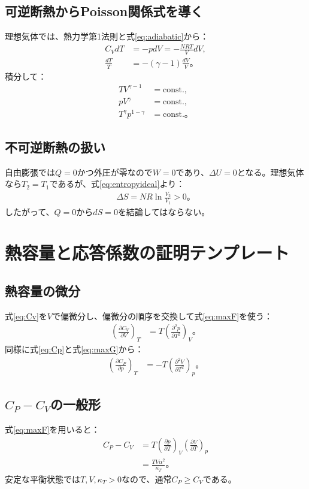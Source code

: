 \documentclass[platex,dvipdfmx,a4paper,10pt]{jsarticle}
\begin{document}
\subsection{可逆断熱からPoisson関係式を導く}
理想気体では、熱力学第1法則と式\eqref{eq:adiabatic}から：
\begin{align*}
  C_VdT&=-pdV=-\frac{NRT}{V}dV,\\
  \frac{dT}{T}&=-(\gamma-1)\frac{dV}{V}。
\end{align*}
積分して：
\begin{align}
  TV^{\gamma-1}&=\mathrm{const.},\label{eq:poissonTV}\\
  pV^\gamma&=\mathrm{const.},\label{eq:poissonPV}\\
  T^\gamma p^{1-\gamma}&=\mathrm{const.}。\label{eq:poissonTp}
\end{align}

\subsection{不可逆断熱の扱い}
自由膨張では$Q=0$かつ外圧が零なので$W=0$であり、$\Delta U=0$となる。理想気体なら$T_2=T_1$であるが、式\eqref{eq:entropyideal}より：
\begin{align*}
  \Delta S=NR\ln\frac{V_2}{V_1}>0。
\end{align*}
したがって、$Q=0$から$dS=0$を結論してはならない。

\newpage
\section{熱容量と応答係数の証明テンプレート}\label{sec:heat-capacity}
\subsection{熱容量の微分}
式\eqref{eq:Cv}を$V$で偏微分し、偏微分の順序を交換して式\eqref{eq:maxF}を使う：
\begin{align}
  \left(\frac{\partial C_V}{\partial V}\right)_T
  &=T\left(\frac{\partial^2p}{\partial T^2}\right)_V。\label{eq:dCvdV}
\end{align}
同様に式\eqref{eq:Cp}と式\eqref{eq:maxG}から：
\begin{align}
  \left(\frac{\partial C_P}{\partial p}\right)_T
  &=-T\left(\frac{\partial^2V}{\partial T^2}\right)_p。\label{eq:dCpdp}
\end{align}

\subsection{$C_P-C_V$の一般形}
式\eqref{eq:maxF}を用いると：
\begin{align}
  C_P-C_V
  &=T\left(\frac{\partial p}{\partial T}\right)_V
       \left(\frac{\partial V}{\partial T}\right)_p\label{eq:CpCvGeneral}\\
  &=\frac{TV\alpha^2}{\kappa_T}。\label{eq:CpCvAlpha}
\end{align}
安定な平衡状態では$T,V,\kappa_T>0$なので、通常$C_P\ge C_V$である。
\end{document}
